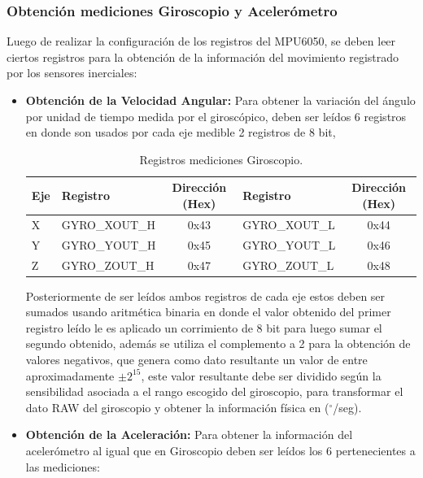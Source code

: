 \documentclass[12pt,a4paper]{article}
\newcommand{\grad}{$^{\circ}$}
\begin{document}
\subsubsection{Obtención mediciones Giroscopio y Acelerómetro}
Luego de realizar la configuración de los registros del MPU6050, se deben leer ciertos registros para la obtención de la información del movimiento registrado por los sensores inerciales:

\begin{itemize}
	\item \textbf{Obtención de la Velocidad Angular:} Para obtener la variación del ángulo por unidad de tiempo medida por el giroscópico, deben ser leídos 6 registros en donde son usados por cada eje medible 2 registros de 8 bit,
	
	\begin{table}[H]
		\centering
		\label{table:registrosgyro}
		\caption{Registros mediciones Giroscopio.}	
		\begin{tabular}{|l|l|c|l|c|}
			\hline
			\textbf{Eje} & \textbf{Registro} & \textbf{Dirección (Hex)} & \textbf{Registro} & \textbf{Dirección (Hex)} \\ \hline
			X            & GYRO\_XOUT\_H     & 0x43                     & GYRO\_XOUT\_L     & 0x44                     \\ \hline
			Y            & GYRO\_YOUT\_H     & 0x45                     & GYRO\_YOUT\_L     & 0x46                     \\ \hline
			Z            & GYRO\_ZOUT\_H     & 0x47                     & GYRO\_ZOUT\_L     & 0x48                     \\ \hline
		\end{tabular}				
	\end{table}
	
	Posteriormente de ser leídos ambos registros de cada eje estos deben ser sumados usando aritmética binaria en donde el valor obtenido del primer registro leído le es aplicado un corrimiento de 8 bit para luego sumar el segundo obtenido, además se utiliza el complemento a 2 para la obtención de valores negativos, que genera como dato resultante un valor de entre aproximadamente $\pm 2^{15}$, este valor resultante debe ser dividido según la sensibilidad asociada a el rango escogido del giroscopio, para transformar el dato RAW del giroscopio y obtener la información física en (\grad/seg).
	
	\item \textbf{Obtención de la Aceleración:} Para obtener la información del acelerómetro al igual que en Giroscopio deben ser leídos los 6 pertenecientes a las mediciones:
	

\end{itemize}
\end{document}
